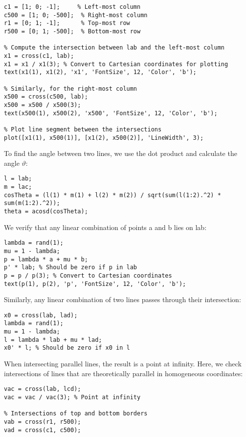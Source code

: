 \begin{lstlisting}[style=MATLAB] 
% Define the image border lines
c1 = [1; 0; -1];     % Left-most column
c500 = [1; 0; -500];  % Right-most column
r1 = [0; 1; -1];      % Top-most row
r500 = [0; 1; -500];  % Bottom-most row

% Compute the intersection between lab and the left-most column
x1 = cross(c1, lab);
x1 = x1 / x1(3); % Convert to Cartesian coordinates for plotting
text(x1(1), x1(2), 'x1', 'FontSize', 12, 'Color', 'b');

% Similarly, for the right-most column
x500 = cross(c500, lab);
x500 = x500 / x500(3);
text(x500(1), x500(2), 'x500', 'FontSize', 12, 'Color', 'b');

% Plot line segment between the intersections
plot([x1(1), x500(1)], [x1(2), x500(2)], 'LineWidth', 3);
\end{lstlisting}
To find the angle between two lines, we use the dot product and calculate the angle $\vartheta$:
\begin{lstlisting}[style=MATLAB] 
% Calculate the angle between lab and lac
l = lab;
m = lac;
cosTheta = (l(1) * m(1) + l(2) * m(2)) / sqrt(sum(l(1:2).^2) * sum(m(1:2).^2));
theta = acosd(cosTheta);
\end{lstlisting}
We verify that any linear combination of points a and b lies on lab:
\begin{lstlisting}[style=MATLAB] 
% Linear combination of points
lambda = rand(1);
mu = 1 - lambda;
p = lambda * a + mu * b;
p' * lab; % Should be zero if p in lab
p = p / p(3); % Convert to Cartesian coordinates
text(p(1), p(2), 'p', 'FontSize', 12, 'Color', 'b');
\end{lstlisting}
Similarly, any linear combination of two lines passes through their intersection:
\begin{lstlisting}[style=MATLAB] 
% Intersection of lines lab and lad
x0 = cross(lab, lad);
lambda = rand(1);
mu = 1 - lambda;
l = lambda * lab + mu * lad;
x0' * l; % Should be zero if x0 in l
\end{lstlisting}
When intersecting parallel lines, the result is a point at infinity.
Here, we check intersections of lines that are theoretically parallel in homogeneous coordinates:
\begin{lstlisting}[style=MATLAB] 
% Intersections of parallel lines lab and lcd
vac = cross(lab, lcd);
vac = vac / vac(3); % Point at infinity

% Intersections of top and bottom borders
vab = cross(r1, r500);
vad = cross(c1, c500);
\end{lstlisting}